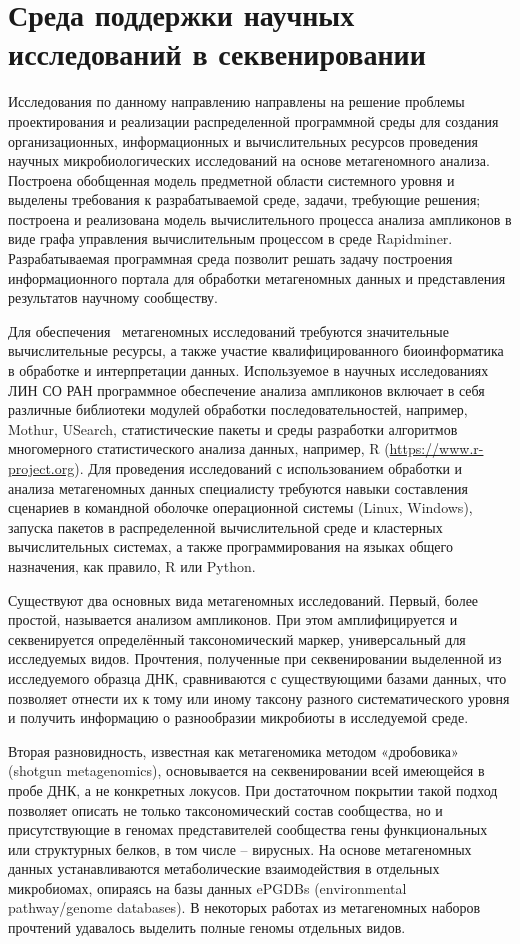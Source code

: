 \documentclass[a4paper,12pt,openany,final]{extreport}
\begin{document}
\chapter{Среда поддержки научных исследований в секвенировании}\label{chap:5}\label{do:cherk}

Исследования по данному направлению направлены на решение проблемы
проектирования и реализации распределенной программной среды для
создания организационных, информационных и вычислительных ресурсов
проведения научных микробиологических исследований на основе
метагеномного анализа. Построена обобщенная модель предметной области
системного уровня и выделены требования к разрабатываемой среде, задачи,
требующие решения; построена и реализована модель вычислительного
процесса анализа ампликонов в виде графа управления вычислительным
процессом в среде Rapidminer. Разрабатываемая программная среда
позволит решать задачу построения информационного портала для обработки
метагеномных данных и представления результатов научному сообществу.

Для обеспечения~ метагеномных исследований требуются значительные
вычислительные ресурсы, а также участие квалифицированного
биоинформатика в обработке и интерпретации данных. Используемое в
научных исследованиях ЛИН СО РАН программное обеспечение анализа
ампликонов включает в себя различные библиотеки модулей обработки
последовательностей, например, Mothur, USearch, статистические пакеты и
среды разработки алгоритмов многомерного статистического анализа данных,
например, R
(\href{https://www.r-project.org/}{{https://www.r-project.org}}). Для
проведения исследований с использованием обработки и анализа
метагеномных данных специалисту требуются навыки составления сценариев в
командной оболочке операционной системы (Linux, Windows), запуска
пакетов в распределенной вычислительной среде и кластерных
вычислительных системах, а также программирования на языках общего
назначения, как правило, R или Python.

Существуют два основных вида метагеномных исследований. Первый, более
простой, называется анализом ампликонов. При этом амплифицируется и
секвенируется определённый таксономический маркер, универсальный для
исследуемых видов. Прочтения, полученные при секвенировании выделенной
из исследуемого образца ДНК, сравниваются с существующими базами данных,
что позволяет отнести их к тому или иному таксону разного
систематического уровня и получить информацию о разнообразии микробиоты
в исследуемой среде.

Вторая разновидность, известная как метагеномика методом «дробовика»
(shotgun metagenomics), основывается на секвенировании всей имеющейся в
пробе ДНК, а не конкретных локусов. При достаточном покрытии такой
подход позволяет описать не только таксономический состав сообщества, но
и присутствующие в геномах представителей сообщества гены функциональных
или структурных белков, в том числе -- вирусных. На основе метагеномных
данных устанавливаются метаболические взаимодействия в отдельных
микробиомах, опираясь на базы данных ePGDBs (environmental
pathway/genome databases). В некоторых работах из метагеномных наборов
прочтений удавалось выделить полные геномы отдельных видов.
\end{document}
